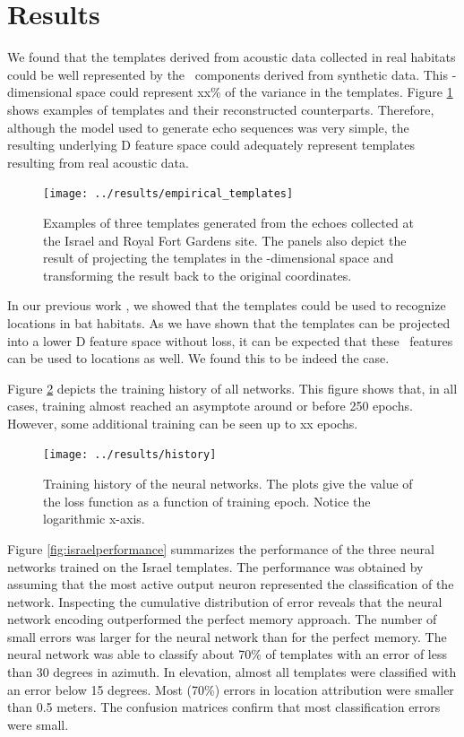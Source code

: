 \documentclass[preprint,5p]{elsarticle}
\begin{document}
\section{Results}

We found that the templates derived from acoustic data collected in real habitats could be well represented by the \pca\ components derived from synthetic data. This \pca-dimensional space could represent xx\% of the variance in the templates. Figure \ref{fig:empiricaltemplates} shows examples of templates and their reconstructed counterparts. Therefore, although the model used to generate echo sequences was very simple, the resulting underlying \pca D feature space could adequately represent templates resulting from real acoustic data.

\begin{figure}[tb]
	\centering
	\texttt{[image: ../results/empirical\_templates]}
	\caption{Examples of three templates generated from the echoes collected at the Israel and Royal Fort Gardens site. The panels also depict the result of projecting the templates in the 
	\pca-dimensional space and transforming the result back to the original coordinates.}
	\label{fig:empiricaltemplates}
\end{figure}

In our previous work \cite{Vanderelst2016}, we showed that the templates could be used to recognize locations in bat habitats. As we have shown that the templates can be projected into a lower \pca D feature space without loss, it can be expected that these \pca\ features can be used to locations as well. We found this to be indeed the case.

Figure \ref{fig:history} depicts the training history of all networks. This figure shows that, in all cases, training almost reached an asymptote around or before 250 epochs. However, some additional training can be seen up to xx epochs.

\begin{figure}
	\centering
	\texttt{[image: ../results/history]}
	\caption{Training history of the neural networks. The plots give the value of the loss function as a function of training epoch. Notice the logarithmic x-axis.}
	\label{fig:history}
\end{figure}

Figure \ref{fig:israelperformance} summarizes the performance of the three neural networks trained on the Israel templates. The performance was obtained by assuming that the most active output neuron represented the classification of the network. Inspecting the cumulative distribution of error reveals that the neural network encoding outperformed the perfect memory approach. The number of small errors was larger for the neural network than for the perfect memory. The neural network was able to classify about 70\% of templates with an error of less than 30 degrees in azimuth. In elevation, almost all templates were classified with an error below 15 degrees. Most (70\%) errors in location attribution were smaller than 0.5 meters. The confusion matrices confirm that most classification errors were small.
\end{document}
